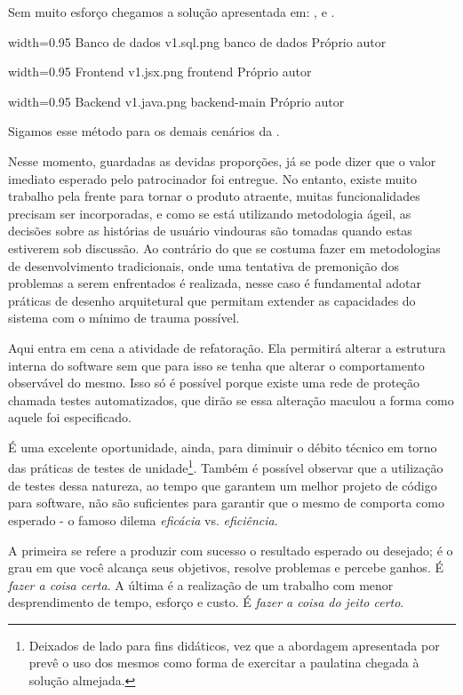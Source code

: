   Sem muito esforço chegamos a solução apresentada em: ,  e .

  \imagem
    {width=0.95\textwidth}
    {Banco de dados}
    {v1.sql.png}
    {banco de dados}
    {Próprio autor}

  \imagem
    {width=0.95\textwidth}
    {Frontend}
    {v1.jsx.png}
    {frontend}
    {Próprio autor}

  \imagem
    {width=0.95\textwidth}
    {Backend}
    {v1.java.png}
    {backend-main}
    {Próprio autor}

  Sigamos esse método para os demais cenários da .

  Nesse momento, guardadas as devidas proporções, já se pode dizer que o valor imediato esperado pelo patrocinador foi entregue. No entanto, existe muito trabalho pela frente para tornar o produto atraente, muitas funcionalidades precisam ser incorporadas, e como se está utilizando metodologia ágeil, as decisões sobre as histórias de usuário vindouras são tomadas quando estas estiverem sob discussão. Ao contrário do que se costuma fazer em metodologias de desenvolvimento tradicionais, onde uma tentativa de premonição dos problemas a serem enfrentados é realizada, nesse caso é fundamental adotar práticas de desenho arquitetural que permitam extender as capacidades do sistema com o mínimo de trauma possível.

  Aqui entra em cena a atividade de refatoração. Ela permitirá alterar a estrutura interna do software sem que para isso se tenha que alterar o comportamento observável do mesmo. Isso só é possível porque existe uma rede de proteção chamada testes automatizados, que dirão se essa alteração maculou a forma como aquele foi especificado.

  É uma excelente oportunidade, ainda, para diminuir o débito técnico em torno das práticas de testes de unidade\footnote{Deixados de lado para fins didáticos, vez que a abordagem apresentada por  prevê o uso dos mesmos como forma de exercitar a paulatina chegada à solução almejada.}. Também é possível observar que a utilização de testes dessa natureza, ao tempo que garantem um melhor projeto de código para software, não são suficientes para garantir que o mesmo de comporta como esperado - o famoso dilema \emph{eficácia} vs. \emph{eficiência}.

  A primeira se refere a produzir com sucesso o resultado esperado ou desejado; é o grau em que você alcança seus objetivos, resolve problemas e percebe ganhos. É \emph{fazer a coisa certa}.
      A última é a realização de um trabalho com menor desprendimento de tempo, esforço e custo. É \emph{fazer a coisa do jeito certo}.\cite[p.2, tradução nossa]{Stack2016}

